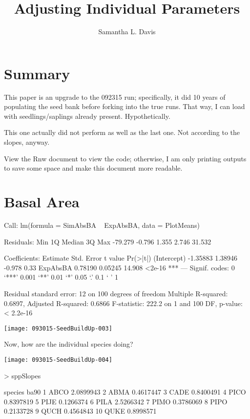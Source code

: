 \documentclass{article}
\begin{document}


\title{Adjusting Individual Parameters}
\author{Samantha L. Davis}

\maketitle

\section{Summary}
This paper is an upgrade to the 092315 run; specifically, it did 10 years of populating the seed bank before forking into the true runs. That way, I can load with seedlings/saplings already present. Hypothetically.

This one actually did not perform as well as the last one. Not according to the slopes, anyway.

View the Rnw document to view the code; otherwise, I am only printing outputs to save some space and make this document more readable.





\newpage

\section{Basal Area}
\begin{Schunk}
\begin{Soutput}
Call:
lm(formula = SimAbsBA ~ ExpAbsBA, data = PlotMeans)

Residuals:
    Min      1Q  Median      3Q     Max 
-79.279  -0.796   1.355   2.746  31.532 

Coefficients:
            Estimate Std. Error t value Pr(>|t|)    
(Intercept) -1.35883    1.38946  -0.978     0.33    
ExpAbsBA     0.78190    0.05245  14.908   <2e-16 ***
---
Signif. codes:  0 ‘***’ 0.001 ‘**’ 0.01 ‘*’ 0.05 ‘.’ 0.1 ‘ ’ 1

Residual standard error: 12 on 100 degrees of freedom
Multiple R-squared:  0.6897,	Adjusted R-squared:  0.6866 
F-statistic: 222.2 on 1 and 100 DF,  p-value: < 2.2e-16
\end{Soutput}
\end{Schunk}
\texttt{[image: 093015-SeedBuildUp-003]}

Now, how are the individual species doing?

\texttt{[image: 093015-SeedBuildUp-004]}
\begin{Schunk}
\begin{Sinput}
>   sppSlopes
\end{Sinput}
\begin{Soutput}
   species      ba90
1     ABCO 2.0899943
2     ABMA 0.4617447
3     CADE 0.8400491
4     PICO 0.8397819
5     PIJE 0.1266374
6     PILA 2.5266342
7     PIMO 0.3786069
8     PIPO 0.2133728
9     QUCH 0.4564843
10    QUKE 0.8998571
\end{Soutput}
\end{Schunk}
\end{document}
